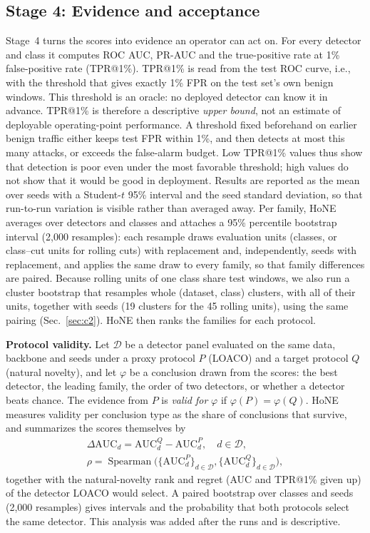 \documentclass[conference]{IEEEtran}
\begin{document}
\subsection{Stage 4: Evidence and acceptance}
\label{sec:prereg}
Stage~4 turns the scores into evidence an operator can act on. For every detector and class it computes ROC AUC, PR-AUC and the true-positive rate at 1\% false-positive rate (TPR@1\%). TPR@1\% is read from the test ROC curve, i.e., with the threshold that gives exactly 1\% FPR on the test set's own benign windows. This threshold is an oracle: no deployed detector can know it in advance. TPR@1\% is therefore a descriptive \emph{upper bound}, not an estimate of deployable operating-point performance. A threshold fixed beforehand on earlier benign traffic either keeps test FPR within 1\%, and then detects at most this many attacks, or exceeds the false-alarm budget. Low TPR@1\% values thus show that detection is poor even under the most favorable threshold; high values do not show that it would be good in deployment. Results are reported as the mean over seeds with a Student-$t$ 95\% interval and the seed standard deviation, so that run-to-run variation is visible rather than averaged away. Per family, HoNE averages over detectors and classes and attaches a 95\% percentile bootstrap interval (2,000 resamples): each resample draws evaluation units (classes, or class--cut units for rolling cuts) with replacement and, independently, seeds with replacement, and applies the same draw to every family, so that family differences are paired. Because rolling units of one class share test windows, we also run a cluster bootstrap that resamples whole (dataset, class) clusters, with all of their units, together with seeds (19 clusters for the 45 rolling units), using the same pairing (Sec.~\ref{sec:c2}). HoNE then ranks the families for each protocol. 

\textbf{Protocol validity.} Let $\mathcal{D}$ be a detector panel evaluated on the same data, backbone and seeds under a proxy protocol $P$ (LOACO) and a target protocol $Q$ (natural novelty), and let $\varphi$ be a conclusion drawn from the scores: the best detector, the leading family, the order of two detectors, or whether a detector beats chance. The evidence from $P$ is \emph{valid for} $\varphi$ if $\varphi(P)=\varphi(Q)$. HoNE measures validity per conclusion type as the share of conclusions that survive, and summarizes the scores themselves by
\begin{gather}
\Delta\text{AUC}_d=\text{AUC}_d^{Q}-\text{AUC}_d^{P},\quad d\in\mathcal{D},\\
\rho=\operatorname{Spearman}\big(\{\text{AUC}^{P}_d\}_{d\in\mathcal{D}},\{\text{AUC}^{Q}_d\}_{d\in\mathcal{D}}\big),
\end{gather}
together with the natural-novelty rank and regret (AUC and TPR@1\% given up) of the detector LOACO would select. A paired bootstrap over classes and seeds (2,000 resamples) gives intervals and the probability that both protocols select the same detector. This analysis was added after the runs and is descriptive.
\end{document}
